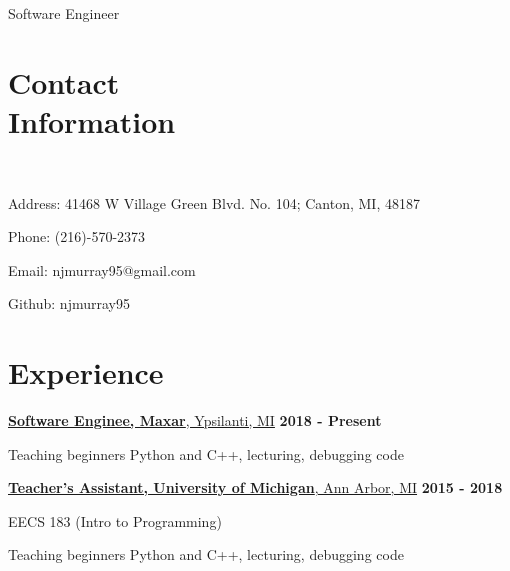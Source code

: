 \documentclass[margin,line]{resume}
\begin{document}
\begin{resume}

    \hfill {\Large Software Engineer}\\

    \section{\mysidestyle Contact\\Information}
    \hfill \\

    \begin{list2}
    \item Address: 41468 W Village Green Blvd. No. 104; Canton, MI, 48187
    \item Phone: (216)-570-2373
    \item Email: njmurray95@gmail.com
    \item Github: njmurray95
    \end{list2}

    \section{\mysidestyle Experience}
    \hfill

    \underline{\textbf{Software Enginee, Maxar}, Ypsilanti, MI}
    \hfill \textbf{\hfill 2018 - Present} \\

    \begin{list2}
    \item Teaching beginners Python and C++, lecturing, debugging code
    \end{list2}

    \underline{\textbf{Teacher's Assistant, University of Michigan}, Ann Arbor, MI}
    \hfill \textbf{2015 - 2018} \\

    \begin{list2}
    \item EECS 183 (Intro to Programming)
    \item Teaching beginners Python and C++, lecturing, debugging code
    \end{list2}


\end{resume}
\end{document}
